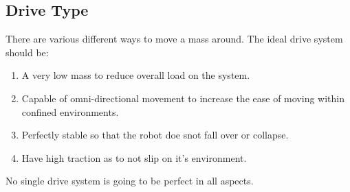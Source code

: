 \subsection{Drive Type}
There are various different ways to move a mass around.  The ideal drive system should be:
\begin{enumerate}
\item A very low mass to reduce overall load on the system.
\item Capable of omni-directional movement to increase the ease of moving within confined environments.
\item Perfectly stable so that the robot doe snot fall over or collapse.
\item Have high traction as to not slip on it's environment.
\end{enumerate}
No single drive system is going to be perfect in all aspects.
